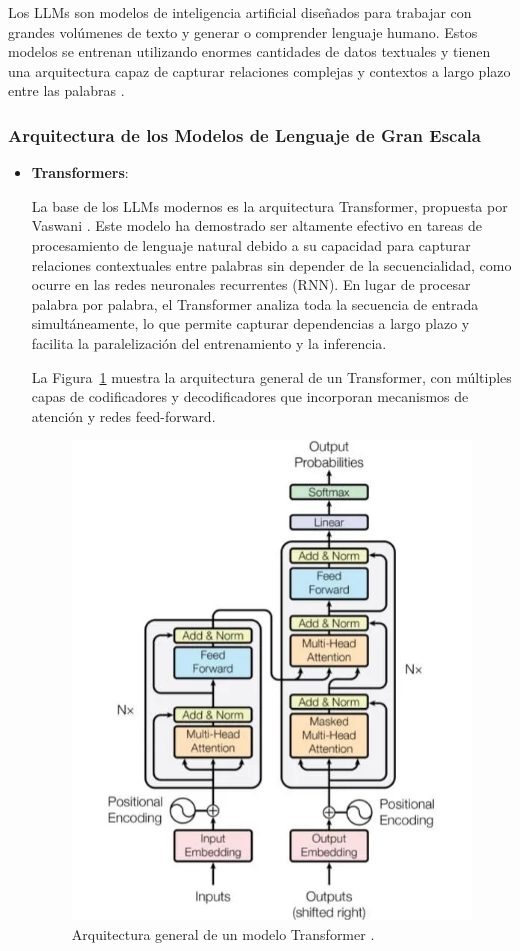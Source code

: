 \documentclass[../main.tex]{subfiles}
\begin{document}
Los LLMs son modelos de inteligencia artificial diseñados para trabajar con grandes volúmenes de texto y generar o comprender lenguaje humano. Estos modelos se entrenan utilizando enormes cantidades de datos textuales y tienen una arquitectura capaz de capturar relaciones complejas y contextos a largo plazo entre las palabras \parencite{zhao2023survey}.

\subsubsection{Arquitectura de los Modelos de Lenguaje de Gran Escala}

\begin{itemize}
	\item \textbf{Transformers}:
	
La base de los LLMs modernos es la arquitectura Transformer, propuesta por Vaswani \parencite{vaswani2017attention}. Este modelo ha demostrado ser altamente efectivo en tareas de procesamiento de lenguaje natural debido a su capacidad para capturar relaciones contextuales entre palabras sin depender de la secuencialidad, como ocurre en las redes neuronales recurrentes (RNN). En lugar de procesar palabra por palabra, el Transformer analiza toda la secuencia de entrada simultáneamente, lo que permite capturar dependencias a largo plazo y facilita la paralelización del entrenamiento y la inferencia.

La Figura~\ref{fig:arquitectura} muestra la arquitectura general de un Transformer, con múltiples capas de codificadores y decodificadores que incorporan mecanismos de atención y redes feed-forward.
	
	\begin{figure}[H]
		\centering
		\includegraphics[width=.4\textwidth]{images/transformers_architecture.png}
		\caption{Arquitectura general de un modelo Transformer \parencite{vaswani2017attention}.}
		\label{fig:arquitectura}
	\end{figure}
	

\end{itemize}
\end{document}
